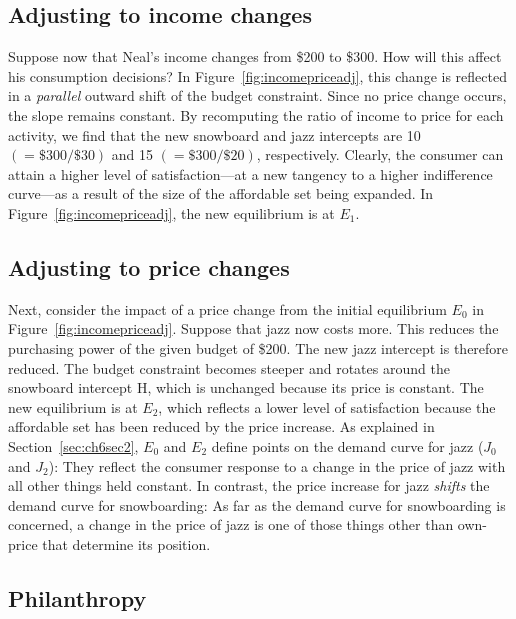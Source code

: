 \newhtmlpage

\subsection*{Adjusting to income changes}

Suppose now that Neal's income changes from \$200 to \$300. How will this
affect his consumption decisions? In Figure~\ref{fig:incomepriceadj}, this
change is reflected in a \textit{parallel} outward shift of the budget
constraint. Since no price change occurs, the slope remains constant. By
recomputing the ratio of income to price for each activity, we find that the
new snowboard and jazz intercepts are 10 $(=\$300/\$30)$ and 15 $(=\$300/\$20)$,
respectively. Clearly, the consumer can attain a higher level of
satisfaction---at a new tangency to a higher indifference curve---as a
result of the size of the affordable set being expanded. In Figure~\ref{fig:incomepriceadj},
the new equilibrium is at $E_1$.



\newhtmlpage

\subsection*{Adjusting to price changes}

Next, consider the impact of a price change from the initial equilibrium $E_0$ 
in Figure~\ref{fig:incomepriceadj}. Suppose that jazz now costs more. This 
reduces the purchasing power of the given budget of \$200. The new jazz
intercept is therefore reduced. The budget constraint
becomes steeper and rotates around the snowboard intercept H, which is
unchanged because its price is constant. The new equilibrium is at $E_2$,
which reflects a lower level of satisfaction because the affordable set has
been reduced by the price increase. As explained in Section~\ref{sec:ch6sec2},
$E_0$ and $E_2$ define points on the demand
curve for jazz ($J_0$ and $J_2$): They reflect the consumer response to a
change in the price of jazz with all other things held constant. In
contrast, the price increase for jazz \textit{shifts} the demand curve for
snowboarding: As far as the demand curve for snowboarding is concerned, a
change in the price of jazz is one of those things other than own-price that
determine its position.

\subsection*{Philanthropy}

